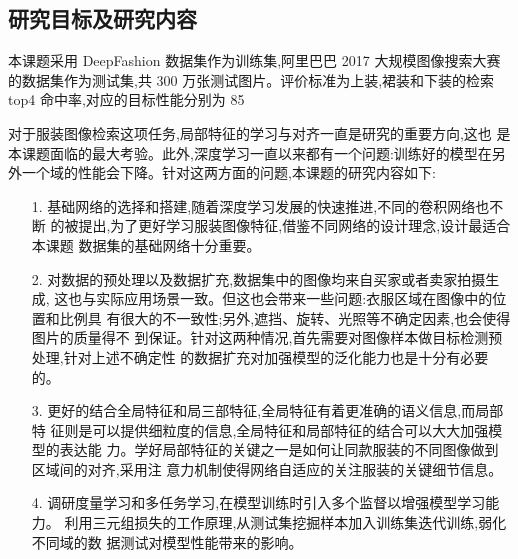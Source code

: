 \subsection{研究目标及研究内容}
本课题采用 DeepFashion 数据集作为训练集,阿里巴巴 2017 大规模图像搜索大赛
的数据集作为测试集,共 300 万张测试图片。评价标准为上装,裙装和下装的检索 top4
命中率,对应的目标性能分别为 85%

对于服装图像检索这项任务,局部特征的学习与对齐一直是研究的重要方向,这也
是本课题面临的最大考验。此外,深度学习一直以来都有一个问题:训练好的模型在另
外一个域的性能会下降。针对这两方面的问题,本课题的研究内容如下:
\begin{itemize}
  \item [1.] 基础网络的选择和搭建,随着深度学习发展的快速推进,不同的卷积网络也不断
    的被提出,为了更好学习服装图像特征,借鉴不同网络的设计理念,设计最适合本课题
    数据集的基础网络十分重要。

  \item [2.] 对数据的预处理以及数据扩充,数据集中的图像均来自买家或者卖家拍摄生成,
    这也与实际应用场景一致。但这也会带来一些问题:衣服区域在图像中的位置和比例具
    有很大的不一致性;另外,遮挡、旋转、光照等不确定因素,也会使得图片的质量得不
    到保证。针对这两种情况,首先需要对图像样本做目标检测预处理,针对上述不确定性
    的数据扩充对加强模型的泛化能力也是十分有必要的。

  \item [3.] 更好的结合全局特征和局三部特征,全局特征有着更准确的语义信息,而局部特
    征则是可以提供细粒度的信息,全局特征和局部特征的结合可以大大加强模型的表达能
    力。学好局部特征的关键之一是如何让同款服装的不同图像做到区域间的对齐,采用注
    意力机制使得网络自适应的关注服装的关键细节信息。

  \item [4.] 调研度量学习和多任务学习,在模型训练时引入多个监督以增强模型学习能力。
    利用三元组损失的工作原理,从测试集挖掘样本加入训练集迭代训练,弱化不同域的数
    据测试对模型性能带来的影响。

\end{itemize}
